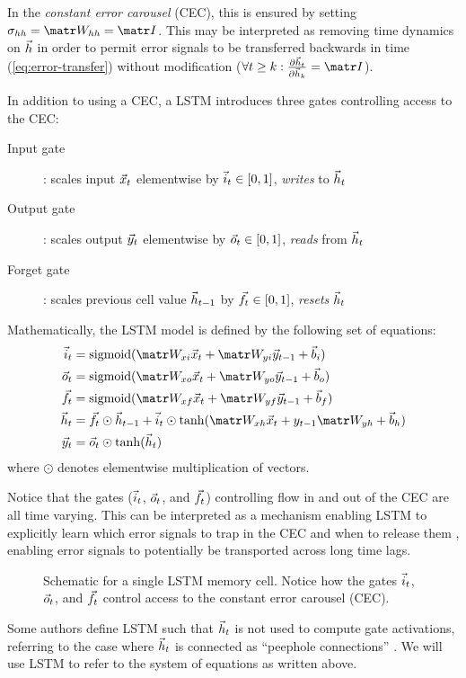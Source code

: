 In the \emph{constant error carousel} (CEC), this is ensured by setting
$\sigma_{hh} = \W_{hh} = \I$. This may be interpreted as removing time dynamics
on $\vec{h}$ in order to permit error signals to be transferred backwards in time
(\cref{eq:error-transfer}) without modification (\ie $\forall t \geq k: \frac{\pd
\h_t}{\pd \h_k} = \I$).

In addition to using a CEC, a LSTM introduces three gates controlling access to the CEC:
\begin{description}
  \item[Input gate]: scales input $\vec{x}_t$ elementwise by $\vec{i}_t \in [0,1]$, \emph{writes} to $\vec{h}_t$
  \item[Output gate]: scales output $\vec{y}_t$ elementwise by $\vec{o}_t \in [0,1]$, \emph{reads} from $\vec{h}_t$
  \item[Forget gate]: scales previous cell value $\vec{h}_{t-1}$ by $\vec{f}_t \in [0,1]$, \emph{resets} $\vec{h}_t$
\end{description}

Mathematically, the LSTM model is defined by the following set of equations:
\begin{align}
    \i_t &= \sigmoid(\W_{xi} \x_t + \W_{yi} \y_{t-1} + \b_i) \\
    \o_t &= \sigmoid(\W_{xo} \x_t + \W_{yo} \y_{t-1} + \b_o) \\
    \f_t &= \sigmoid(\W_{xf} \x_t + \W_{yf} \y_{t-1} + \b_f) \\
    \h_t &= \f_t \odot \h_{t-1} + \i_t \odot \tanh(\W_{xh}\x_t + y_{t-1} \W_{yh} + \b_h) \\
    \y_t &= \o_t \odot \tanh(\h_t)
\end{align}
where $\odot$ denotes elementwise multiplication of vectors.

Notice that the gates ($\vec{i}_t$, $\vec{o}_t$, and $\vec{f}_t$) controlling flow in and out
of the CEC are all time varying. This can be interpreted as a mechanism
enabling LSTM to explicitly learn which error signals to trap in the CEC and
when to release them \citep{hochreiter1997long}, enabling error signals to
potentially be transported across long time lags.

\begin{figure}[tb]
    \centering
    
    \caption{Schematic for a single LSTM memory cell. Notice how the gates $\vec{i}_t$, $\vec{o}_t$, and $\vec{f}_t$ control access to the constant error carousel (CEC).}
    \label{fig:lstm-cell}
\end{figure}

Some authors define LSTM such that $\vec{h}_t$ is not used to compute gate
activations, referring to the case where $\vec{h}_t$ is connected as ``peephole
connections'' \citep{gers2000recurrent}. We will use LSTM to refer to the
system of equations as written above.

